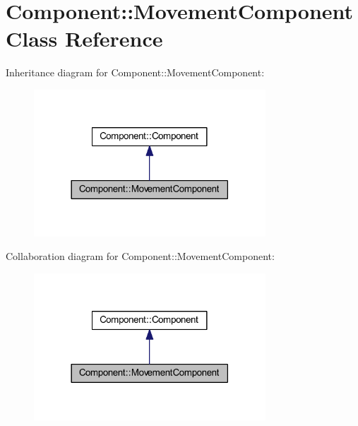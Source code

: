 \hypertarget{class_component_1_1_movement_component}{}\section{Component\+:\+:Movement\+Component Class Reference}
\label{class_component_1_1_movement_component}


Inheritance diagram for Component\+:\+:Movement\+Component\+:
\nopagebreak
\begin{figure}[H]
\begin{center}
\leavevmode
\includegraphics[width=246pt]{class_component_1_1_movement_component__inherit__graph}
\end{center}
\end{figure}


Collaboration diagram for Component\+:\+:Movement\+Component\+:
\nopagebreak
\begin{figure}[H]
\begin{center}
\leavevmode
\includegraphics[width=246pt]{class_component_1_1_movement_component__coll__graph}
\end{center}
\end{figure}
